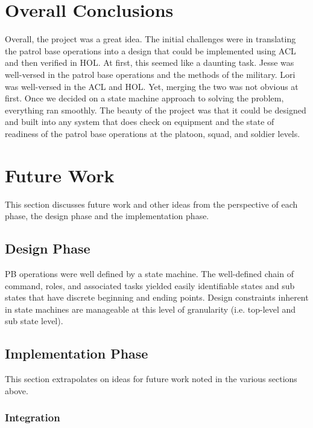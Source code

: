 \section{Overall Conclusions}
\label{sec:overall-conclusions}

Overall, the project was a great idea. The initial challenges were in
translating the patrol base operations into a design that could be
implemented using ACL and then verified in HOL. At first, this seemed
like a daunting task. Jesse was well-versed in the patrol base operations
and the methods of the military. Lori was well-versed in the ACL and HOL.
Yet, merging the two was not obvious at first. Once we decided on a state
machine approach to solving the problem, everything ran smoothly. The
beauty of the project was that it could be designed and built into any
system that does check on equipment and the state of readiness of the
patrol base operations at the platoon, squad, and soldier levels.

\section{Future Work}
\label{sec:future-work}

This section discusses future work and other ideas from the perspective of each phase, the design phase and the implementation phase.

\subsection{Design Phase}
\label{sec:design-phase-1}

PB operations were well defined by a state machine. The well-defined
chain of command, roles, and associated tasks yielded easily identifiable
states and sub states that have discrete beginning and ending points.
Design constraints inherent in state machines are manageable at this level
of granularity (i.e. top-level and sub state level).

\subsection{Implementation Phase}
\label{sec:implementation-phase-1}

This section extrapolates on ideas for future work noted in the
various sections above.

\subsubsection{Integration}
\label{sec:integration-2}

